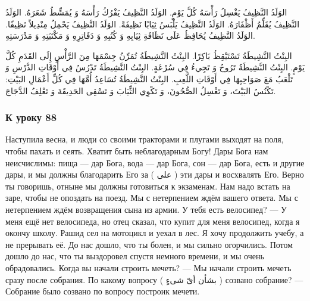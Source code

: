 \documentclass[a5paper]{article}
\begin{document}
الوَلَدُ النَّظِيفُ يَغْسِلُ رَأْسَهُ كُلَّ يَوْمٍ. الوَلَدُ النَّظِيفُ يَفْرُكُ رَأْسَهُ وَ يُمَشِّطُ شَعَرَهُ. الوَلَدُ النَّظِيفُ يُقَلِّمُ أَظْفَارَهُ. الوَلَدُ النَّظِيفُ يَلْبَسُ ثِيَابًا نَظِيفَةً. الوَلَدُ النَّظِيفُ يَحْمِلُ مِنْدِيلاً نَظِيفًا. الوَلَدُ النَّظِيفُ يُحَافِظُ عَلَى نَظَافَةِ ثِيَابِهِ وَ كُتُبِهِ وَ دَفَاتِرِهِ وَ مَكْتَبَتِهِ وَ مَدْرَسَتِهِ.

البِنْتُ النَّشِيطَةُ تَسْتَيْقِظُ بَاكِرًا. البِنْتُ النَّشِيطَةُ تُمَرِّنُ جِسْمَهَا مِنَ الرَّأْسِ إِلَى القَدَمِ كُلَّ يَوْمٍ. البِنْتُ النَّشِيطَةُ تَرُوحُ وَ تَجِيءُ فِي سُرْعَةٍ. البِنْتُ النَّشِيطَةُ تَدْرُسُ فِي أَوْقَاتِ الدَّرْسِ وَ تَلْعَبُ مَعَ صَوَاحِبِهَا فِي أَوْقَاتِ اللَّعِبِ. البِنْتُ النَّشِيطَةُ تُسَاعِدُ أُمَّهَا فِي كُلِّ أَعْمَالِ البَيْتِ: تَكْنُسُ البَيْتَ، وَ تَغْسِلُ الصُّحُونَ، وَ تَكْوِي الثِّيَابَ وَ تَسْقِى الحَدِيقَةَ وَ تَعْلِفُ الدَّجَاجَ.

\subsubsection{К уроку 88}
Наступила весна, и люди со своими тракторами и плугами выходят на поля, чтобы пахать и сеять. Хватит быть неблагодарным Богу! Дары Бога нам неисчислимы: пища — дар Бога, вода — дар Бога, сон — дар Бога, есть и другие дары, и мы должны благодарить Его за ( على ) эти дары и восхвалять Его. Верно ты говоришь, отныне мы должны готовиться к экзаменам. Нам надо встать на заре, чтобы не опоздать на поезд. Мы с нетерпением ждём вашего ответа. Мы с нетерпением ждём возвращения сына из армии. У тебя есть велосипед? — У меня ещё нет велосипеда, но отец сказал, что купит для меня велосипед, когда я окончу школу. Рашид сел на мотоцикл и уехал в лес. Я хочу продолжить учебу, а не прерывать её. До нас дошло, что ты болен, и мы сильно огорчились. Потом дошло до нас, что ты выздоровел спустя немного времени, и мы очень обрадовались. Когда вы начали строить мечеть? — Мы начали строить мечеть сразу после собрания. По какому вопросу ( بشأن أىّ شىءٍ ) созвано собрание? — Собрание было созвано по вопросу построик мечети.
\end{document}
